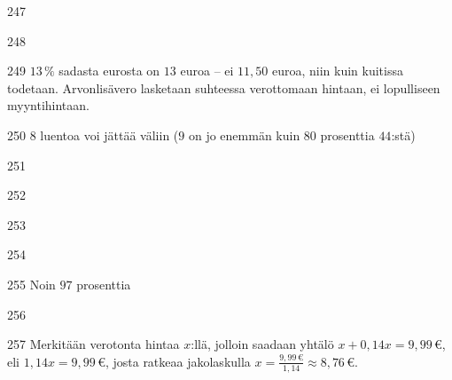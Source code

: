 \begin{Vastaus}{247}
    
\end{Vastaus}
\begin{Vastaus}{248}
    
\end{Vastaus}
\begin{Vastaus}{249}
         $13\,\%$ sadasta eurosta on $13$ euroa -- ei $11,50$ euroa, niin kuin kuitissa todetaan. Arvonlisävero lasketaan suhteessa verottomaan hintaan, ei lopulliseen myyntihintaan.
    
\end{Vastaus}
\begin{Vastaus}{250}
	$8$ luentoa voi jättää väliin ($9$ on jo enemmän kuin $80$ prosenttia $44$:stä)
	
\end{Vastaus}
\begin{Vastaus}{251}
    
\end{Vastaus}
\begin{Vastaus}{252}
	
\end{Vastaus}
\begin{Vastaus}{253}
    
\end{Vastaus}
\begin{Vastaus}{254}
    
\end{Vastaus}
\begin{Vastaus}{255}
Noin $97$ prosenttia
	
\end{Vastaus}
\begin{Vastaus}{256}
	
\end{Vastaus}
\begin{Vastaus}{257}
	Merkitään verotonta hintaa $x$:llä, jolloin saadaan yhtälö $x+0,14x=9,99\,€$, eli $1,14x=9,99\,€$, josta ratkeaa jakolaskulla $x=\frac{9,99\,€}{1,14}\approx 8,76\,€$.
	
\end{Vastaus}
